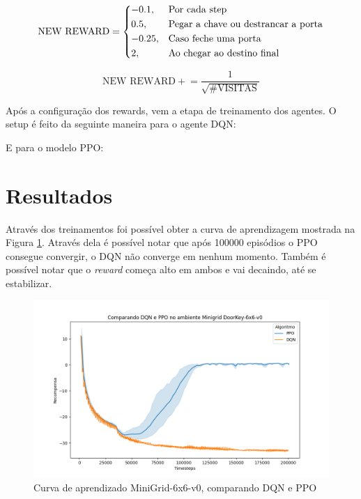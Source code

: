 \documentclass[9pt,a4paper,twoside]{tau}
\begin{document}
\begin{equation}
    \label{ec:equation2}
    \text{NEW REWARD} =
    \begin{dcases}
      -0.1,                      & \text{Por cada step}                       \\
        0.5,                        & \text{Pegar a chave ou destrancar a porta}     \\
        -0.25,                      & \text{Caso feche uma porta}                       \\
        2,                          & \text{Ao chegar ao destino final}
    \end{dcases}
\end{equation}

\begin{equation}
    \label{ec:equation3}
   \text{NEW REWARD} +\!= \frac{1}{\sqrt{\text{\#VISITAS}}}
\end{equation}

Após a configuração dos rewards, vem a etapa de treinamento dos agentes. O setup é feito da seguinte maneira para o agente DQN:

E para o modelo PPO:


\section{Resultados}

Através dos treinamentos foi possível obter a curva de aprendizagem mostrada na Figura \ref{fig:figure}. Através dela é possível notar que após 100000 episódios o PPO consegue convergir, o DQN não converge em nenhum momento. Também é possível notar que o \textit{reward} começa alto em ambos e vai decaindo, até se estabilizar.

\begin{figure}[htbp]
    \centering
    \includegraphics[width=0.8\columnwidth]{assets/plot.png}
    \caption{Curva de aprendizado MiniGrid-6x6-v0, comparando DQN e PPO}
    \label{fig:figure}
\end{figure}
\end{document}
